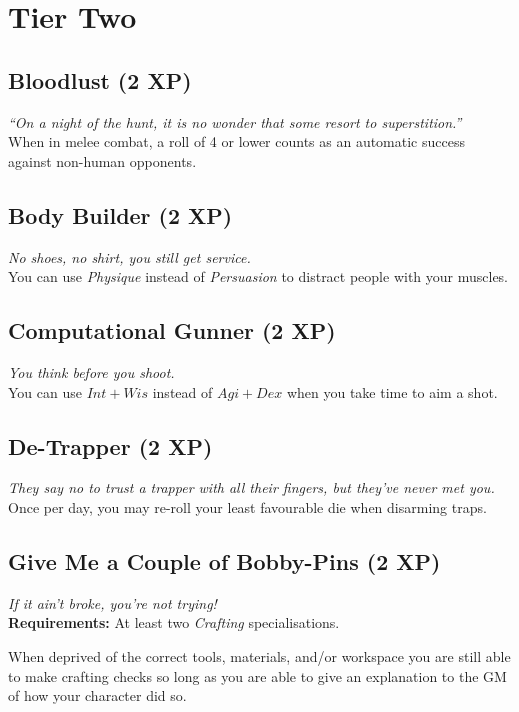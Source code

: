 \section{Tier Two}

\subsection*{Bloodlust (2 XP)}
\textit{``On a night of the hunt, it is no wonder that some resort to superstition.''}\\
When in melee combat, a roll of 4 or lower counts as an automatic success against non-human opponents.

\subsection*{Body Builder (2 XP)}
\textit{No shoes, no shirt, you still get service.}\\
You can use \textit{Physique} instead of \textit{Persuasion} to distract people with your muscles.

\subsection*{Computational Gunner (2 XP)}
\textit{You think before you shoot.}\\
You can use $Int+Wis$ instead of $Agi+Dex$ when you take time to aim a shot.

\subsection*{De-Trapper (2 XP)}
\textit{They say no to trust a trapper with all their fingers, but they've never met you.}\\
Once per day, you may re-roll your least favourable die when disarming traps.

\subsection*{Give Me a Couple of Bobby-Pins (2 XP)}
\textit{If it ain't broke, you're not trying!}\\
\textbf{Requirements:} At least two \textit{Crafting} specialisations.

When deprived of the correct tools, materials, and/or workspace you are still able to make crafting checks so long as you are able to give an explanation to the GM of how your character did so.


